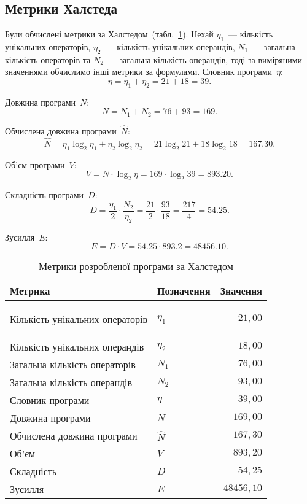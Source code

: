 \documentclass[a4paper,oneside,DIV=12,12pt]{scrartcl}
\begin{document}
		\subsection{Метрики Халстеда}
			Були обчислені метрики за Халстедом~(табл.~\ref{tab:software-metrics-halstead}). Нехай $\eta_1$~— кількість унікальних операторів, $\eta_2$~— кількість унікальних операндів, $N_1$~— загальна кількість операторів та $N_2$~— загальна кількість операндів, тоді за виміряними значеннями обчислимо інші метрики за формулами. Словник програми~$\eta$:
			\[
				\eta = \eta_1 + \eta_2 = 21 + 18 = 39.
			\]
			
			Довжина програми~$N$:
			\[
				N = N_1 + N_2 = 76 + 93 = 169.
			\]
			
			Обчислена довжина програми~$\hat{N}$:
			\[
				\hat{N} = \eta_1 \log_2 \eta_1 + \eta_2 \log_2 \eta_2
						= 21 \log_2 21 + 18 \log_2 18
						= \num{167,30}.
			\]
			
			Об'єм програми~$V$:
			\[
				V = N \cdot \log_2 \eta
				  = 169 \cdot \log_2 39
				  = \num{893,20}.
			\]
			
			Складність програми~$D$:
			\[
				D = \frac{\eta_1}{2} \cdot \frac{N_2}{\eta_2}
				  = \frac{21}{2} \cdot \frac{93}{18}
				  = \frac{217}{4}
				  = \num{54,25}.
			\]
			
			Зусилля~$E$:
			\[
				E = D \cdot V
				  = \num{54,25} \cdot \num{893,2}
				  = \num{48456,10}.
			\]
			
			\begin{longtable}[c]{llr}
					\toprule
						Метрика & Позначення & Значення\\
					\midrule
					\endhead
					\bottomrule
					\caption{Метрики розробленої програми за Халстедом}
					\endfoot
					\label{tab:software-metrics-halstead}
					
						Кількість унікальних операторів & $\eta_1$  & $21{,}00$\\
						Кількість унікальних операндів  & $\eta_2$  & $18{,}00$\\
						Загальна кількість операторів   & $N_1$     & $76{,}00$\\
						Загальна кількість операндів    & $N_2$     & $93{,}00$\\
						Словник програми                & $\eta$    & $39{,}00$\\
						Довжина програми                & $N$       & $169{,}00$\\
						Обчислена довжина програми      & $\hat{N}$ & $167{,}30$ \\
						Об'єм                           & $V$       & $893{,}20$ \\
						Складність                      & $D$       & $54{,}25$ \\
						Зусилля                         & $E$       & $48456{,}10$ \\
			\end{longtable}
		
\end{document}
